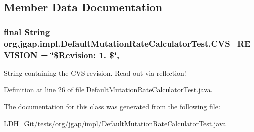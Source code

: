 \subsection{Member Data Documentation}
\hypertarget{classorg_1_1jgap_1_1impl_1_1_default_mutation_rate_calculator_test_a94e35cd33b612e98299812fc6086f80c}{
\subsubsection[{C\-V\-S\-\_\-\-R\-E\-V\-I\-S\-I\-O\-N}]{\setlength{\rightskip}{0pt plus 5cm}final String org.\-jgap.\-impl.\-Default\-Mutation\-Rate\-Calculator\-Test.\-C\-V\-S\-\_\-\-R\-E\-V\-I\-S\-I\-O\-N = \char`\"{}\$Revision\-: 1. \$\char`\"{}\hspace{0.3cm}{\ttfamily [static]}, {\ttfamily [private]}}}\label{classorg_1_1jgap_1_1impl_1_1_default_mutation_rate_calculator_test_a94e35cd33b612e98299812fc6086f80c}
String containing the C\-V\-S revision. Read out via reflection! 

Definition at line 26 of file Default\-Mutation\-Rate\-Calculator\-Test.\-java.



The documentation for this class was generated from the following file\-:\begin{DoxyCompactItemize}
\item 
L\-D\-H\-\_\-\-Git/tests/org/jgap/impl/\hyperlink{_default_mutation_rate_calculator_test_8java}{Default\-Mutation\-Rate\-Calculator\-Test.\-java}\end{DoxyCompactItemize}
